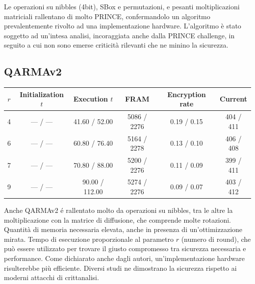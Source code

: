\documentclass[target=bach,aauheader=,style=]{thud}
\begin{document}
		Le operazioni su nibbles (4bit), SBox e permutazioni, e pesanti moltiplicazioni matriciali rallentano di molto PRINCE, confermandolo un algoritmo prevalentemente rivolto ad una implementazione hardware. L'algoritmo è stato soggetto ad un'intesa analisi, incoraggiata anche dalla PRINCE challenge, in seguito a cui non sono emerse criticità rilevanti che ne minino la sicurezza.
		\subsection{QARMAv2}
		\begin{center}
			\begin{tabular}{|c| *{5}{c|}}
				\hline
				$r$ & \textbf{Initialization} $t$& \textbf{Execution} $t$ & \textbf{FRAM} & \textbf{Encryption rate} & \textbf{Current} \\
				\hline
				4 & \textcolor{Mahogany}{---} / \textcolor{OliveGreen}{---} & \textcolor{Mahogany}{41.60} / \textcolor{OliveGreen}{52.00} & \textcolor{Mahogany}{5086} / \textcolor{OliveGreen}{2276} & \textcolor{Mahogany}{0.19} / \textcolor{OliveGreen}{0.15} & \textcolor{Mahogany}{404} / \textcolor{OliveGreen}{411} \\
				\hline
				6 & \textcolor{Mahogany}{---} / \textcolor{OliveGreen}{---} & \textcolor{Mahogany}{60.80} / \textcolor{OliveGreen}{76.40} & \textcolor{Mahogany}{5164} / \textcolor{OliveGreen}{2278} & \textcolor{Mahogany}{0.13} / \textcolor{OliveGreen}{0.10} & \textcolor{Mahogany}{406} / \textcolor{OliveGreen}{408} \\
				\hline
				7 & \textcolor{Mahogany}{---} / \textcolor{OliveGreen}{---} & \textcolor{Mahogany}{70.80} / \textcolor{OliveGreen}{88.00} & \textcolor{Mahogany}{5200} / \textcolor{OliveGreen}{2276} & \textcolor{Mahogany}{0.11} / \textcolor{OliveGreen}{0.09} & \textcolor{Mahogany}{399} / \textcolor{OliveGreen}{411} \\
				\hline
				9 & \textcolor{Mahogany}{---} / \textcolor{OliveGreen}{---} & \textcolor{Mahogany}{90.00} / \textcolor{OliveGreen}{112.00} & \textcolor{Mahogany}{5274} / \textcolor{OliveGreen}{2276} & \textcolor{Mahogany}{0.09} / \textcolor{OliveGreen}{0.07} & \textcolor{Mahogany}{403} / \textcolor{OliveGreen}{412} \\
				\hline
			\end{tabular}
		\end{center}
		
		Anche QARMAv2 é rallentato molto da operazioni su nibbles, tra le altre la moltiplicazione con la matrice di diffusione, che comprende molte rotazioni. Quantità di memoria necessaria elevata, anche in presenza di un'ottimizzazione mirata. Tempo di esecuzione proporzionale al parametro $r$ (numero di round), che può essere utilizzato per trovare il giusto compromesso tra sicurezza necessaria e performance. Come dichiarato anche dagli autori, un'implementazione hardware risulterebbe più efficiente. Diversi studi ne dimostrano la sicurezza rispetto ai moderni attacchi di crittanalisi.
\end{document}
